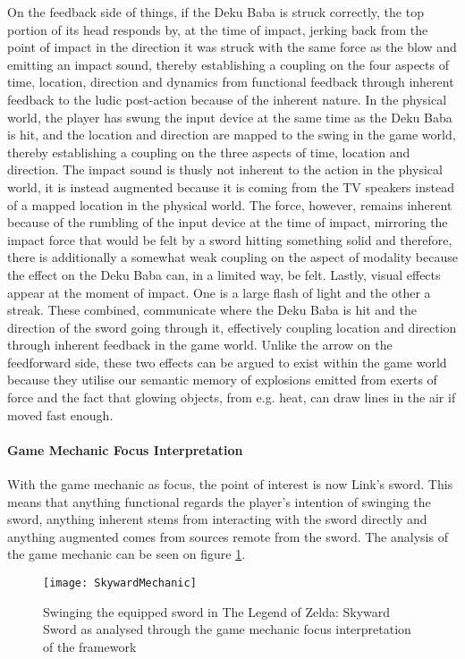 On the feedback side of things, if the Deku Baba is struck correctly, the top portion of its head responds by, at the time of impact, jerking back from the point of impact in the direction it was struck with the same force as the blow and emitting an impact sound, thereby establishing a coupling on the four aspects of time, location, direction and dynamics from functional feedback through inherent feedback to the ludic post-action because of the inherent nature. In the physical world, the player has swung the input device at the same time as the Deku Baba is hit, and the location and direction are mapped to the swing in the game world, thereby establishing a coupling on the three aspects of time, location and direction. The impact sound is thusly not inherent to the action in the physical world, it is instead augmented because it is coming from the TV speakers instead of a mapped location in the physical world. The force, however, remains inherent because of the rumbling of the input device at the time of impact, mirroring the impact force that would be felt by a sword hitting something solid and therefore, there is additionally a somewhat weak coupling on the aspect of modality because the effect on the Deku Baba can, in a limited way, be felt. Lastly, visual effects appear at the moment of impact. One is a large flash of light and the other a streak. These combined, communicate where the Deku Baba is hit and the direction of the sword going through it, effectively coupling location and direction through inherent feedback in the game world. Unlike the arrow on the feedforward side, these two effects can be argued to exist within the game world because they utilise our semantic memory of explosions emitted from exerts of force and the fact that glowing objects, from e.g. heat, can draw lines in the air if moved fast enough.

\paragraph{Game Mechanic Focus Interpretation}
With the game mechanic as focus, the point of interest is now Link's sword. This means that anything functional regards the player's intention of swinging the sword, anything inherent stems from interacting with the sword directly and anything augmented comes from sources remote from the sword. The analysis of the game mechanic can be seen on figure \ref{SkywardMechanic}.

\begin{figure}[hb]
  \texttt{[image: SkywardMechanic]}
  \caption{Swinging the equipped sword in The Legend of Zelda: Skyward Sword as analysed through the game mechanic focus interpretation of the framework}
  \label{SkywardMechanic}
\end{figure}

